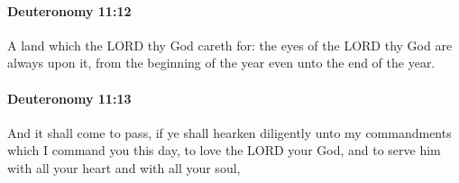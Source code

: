		\paragraph{Deuteronomy 11:12} %
			\label{DEUTERONOMY-11-12}

			A land which the LORD thy God careth for: the eyes of the LORD thy God are always upon it, from the beginning of the year even unto the end of the year.


		\paragraph{Deuteronomy 11:13} %
			\label{DEUTERONOMY-11-13}

			And it shall come to pass, if ye shall hearken diligently unto my commandments which I command you this day, to love the LORD your God, and to serve him with all your heart and with all your soul,

